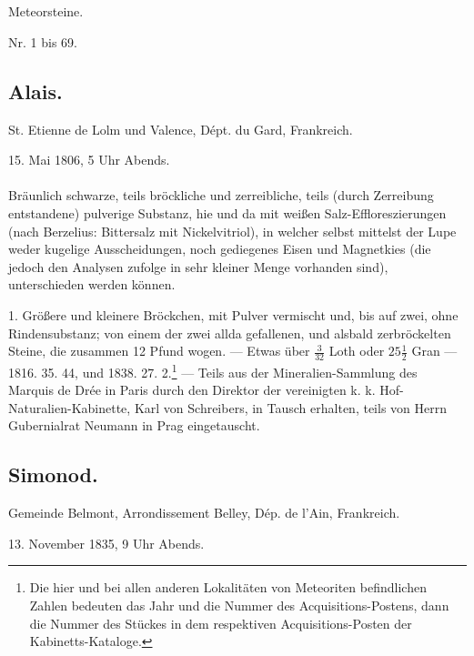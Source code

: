\documentclass[a4paper, 11pt, oneside, polutonikogreek, german]{article}
\begin{document}
\section{}
\begin{center}
{\LARGE Meteorsteine.}

Nr. 1 bis 69.
\end{center}
\subsection{Alais.}
\begin{center}
\small
St. Etienne de Lolm und Valence, Dépt. du Gard, Frankreich.

15. Mai 1806, 5 Uhr Abends.
\end{center}
\paragraph{}
Bräunlich schwarze, teils bröckliche und zerreibliche, teils (durch Zerreibung entstandene) pulverige Substanz, hie und da mit weißen Salz-Effloreszierungen (nach Berzelius: Bittersalz mit Nickelvitriol), in welcher selbst mittelst der Lupe weder kugelige Ausscheidungen, noch gediegenes Eisen und Magnetkies (die jedoch den Analysen zufolge in sehr kleiner Menge vorhanden sind), unterschieden werden können.

1. Größere und kleinere Bröckchen, mit Pulver vermischt und, bis auf zwei, ohne Rindensubstanz; von einem der zwei allda gefallenen, und alsbald zerbröckelten Steine, die zusammen 12 Pfund wogen. — Etwas über $\frac{3}{32}$ Loth oder $25\frac{1}{2}$ Gran — 1816. 35. 44, und 1838. 27. 2.\footnote{Die hier und bei allen anderen Lokalitäten von Meteoriten befindlichen Zahlen bedeuten das Jahr und die Nummer des Acquisitions-Postens, dann die Nummer des Stückes in dem respektiven Acquisitions-Posten der Kabinetts-Kataloge.} — Teils aus der Mineralien-Sammlung des Marquis de Drée in Paris durch den Direktor der vereinigten k. k. Hof-Naturalien-Kabinette, Karl von Schreibers, in Tausch erhalten, teils von Herrn Gubernialrat Neumann in Prag eingetauscht.
\subsection{Simonod.}
\begin{center}
\small
Gemeinde Belmont, Arrondissement Belley, Dép. de l’Ain, Frankreich.

13. November 1835, 9 Uhr Abends.
\end{center}
\end{document}
